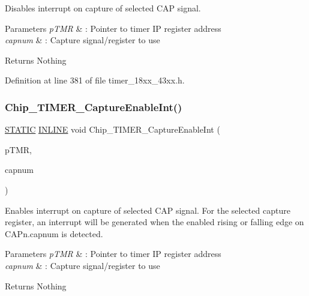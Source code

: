 Disables interrupt on capture of selected C\+AP signal. 


\begin{DoxyParams}{Parameters}
{\em p\+T\+MR} & \+: Pointer to timer IP register address \\
\hline
{\em capnum} & \+: Capture signal/register to use \\
\hline
\end{DoxyParams}
\begin{DoxyReturn}{Returns}
Nothing 
\end{DoxyReturn}


Definition at line 381 of file timer\+\_\+18xx\+\_\+43xx.\+h.

\mbox{\label{group___t_i_m_e_r__18_x_x__43_x_x_ga141861bd1b18812fcfd231b8a42065d8}} 
\subsubsection{\texorpdfstring{Chip\+\_\+\+T\+I\+M\+E\+R\+\_\+\+Capture\+Enable\+Int()}{Chip\_TIMER\_CaptureEnableInt()}}
{\footnotesize\ttfamily \hyperlink{group___l_p_c___types___public___macros_ga10b2d890d871e1489bb02b7e70d9bdfb}{S\+T\+A\+T\+IC} \hyperlink{spifi__18xx__43xx_8h_a2eb6f9e0395b47b8d5e3eeae4fe0c116}{I\+N\+L\+I\+NE} void Chip\+\_\+\+T\+I\+M\+E\+R\+\_\+\+Capture\+Enable\+Int (\begin{DoxyParamCaption}\item[{\hyperlink{struct_l_p_c___t_i_m_e_r___t}{L\+P\+C\+\_\+\+T\+I\+M\+E\+R\+\_\+T} $\ast$}]{p\+T\+MR,  }\item[{int8\+\_\+t}]{capnum }\end{DoxyParamCaption})}



Enables interrupt on capture of selected C\+AP signal. For the selected capture register, an interrupt will be generated when the enabled rising or falling edge on C\+A\+Pn.\+capnum is detected. 


\begin{DoxyParams}{Parameters}
{\em p\+T\+MR} & \+: Pointer to timer IP register address \\
\hline
{\em capnum} & \+: Capture signal/register to use \\
\hline
\end{DoxyParams}
\begin{DoxyReturn}{Returns}
Nothing 
\end{DoxyReturn}


